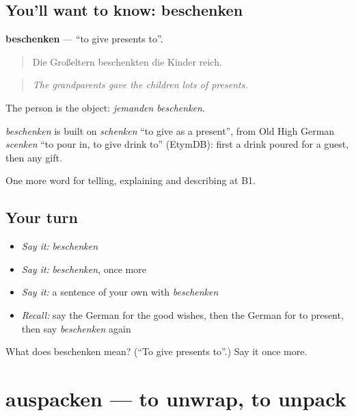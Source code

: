 \subsection*{You'll want to know: beschenken}
\textbf{beschenken} — \textquotedblleft{}to give presents to\textquotedblright{}.

\begin{quote}
Die Großeltern beschenkten die Kinder reich.
\end{quote}

\begin{quote}
\emph{The grandparents gave the children lots of presents.}
\end{quote}

The person is the object: \emph{jemanden beschenken}.

\begin{cousinweb}
\emph{beschenken} is built on \emph{schenken} \textquotedblleft{}to give as a present\textquotedblright{}, from Old High German \emph{scenken} \textquotedblleft{}to pour in, to give drink to\textquotedblright{} (EtymDB): first a drink poured for a guest, then any gift.
\end{cousinweb}

\begin{grammarlens}[title={What you've built}]
One more word for telling, explaining and describing at B1.
\end{grammarlens}

\subsection*{Your turn}
\begin{itemize}
\raggedright
  \item \emph{Say it:} \emph{beschenken}
  \item \emph{Say it:} \emph{beschenken}, once more
  \item \emph{Say it:} a sentence of your own with \emph{beschenken}
  \item \emph{Recall:} say the German for the good wishes, then the German for to present, then say \emph{beschenken} again
\end{itemize}

\begin{tcolorbox}[breakable,colback=teal!4,colframe=teal!35!black,title={Before you move on}]
What does beschenken mean? (\textquotedblleft{}To give presents to\textquotedblright{}.) Say it once more.
\end{tcolorbox}
\section[auspacken]{auspacken — to unwrap, to unpack}

